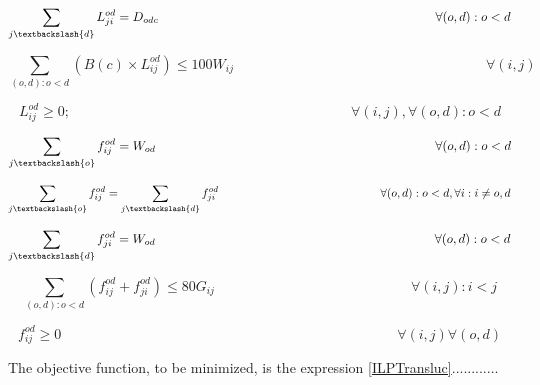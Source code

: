 \begin{equation}
\sum_{j \textbackslash \{d\} } L_{ji}^{od} = D_{odc}
\qquad \qquad \qquad \qquad \qquad \qquad \qquad \qquad \qquad \qquad \qquad
\forall (o,d):o<d
\label{ILPTransluc3}
\end{equation}

\begin{equation}
\sum_{(o,d):o<d} \left( B(c) \times L_{ij}^{od}\right) \leq  100 W_{ij}
\qquad \qquad \qquad \qquad \qquad \qquad \qquad \qquad \qquad
\forall (i,j)
\label{ILPTransluc4}
\end{equation}

\begin{equation}
L_{ij}^{od} \geq 0;
\qquad \qquad \qquad \qquad \qquad \qquad \qquad \qquad \qquad \qquad
\forall (i,j) , \forall (o,d) : o < d
\label{ILPTransluc5}
\end{equation}

\begin{equation}
\sum_{j \textbackslash \{o\} } f_{ij}^{od} = W_{od}
\qquad \qquad \qquad \qquad \qquad \qquad \qquad \qquad \qquad \qquad \qquad
\forall (o,d):o<d
\label{ILPTransluc6}
\end{equation}

\begin{equation}
\sum_{j \textbackslash \{o\} } f_{ij}^{od} = \sum_{j \textbackslash \{d\} } f_{ji}^{od}
\qquad \qquad \qquad \qquad \qquad \qquad \qquad
\forall (o,d):o<d , \forall i : i \neq o,d
\label{ILPTransluc7}
\end{equation}

\begin{equation}
\sum_{j \textbackslash \{d\} } f_{ji}^{od} = W_{od}
\qquad \qquad \qquad \qquad \qquad \qquad \qquad \qquad \qquad \qquad \qquad
\forall (o,d):o<d
\label{ILPTransluc8}
\end{equation}

\begin{equation}
\sum_{(o,d):o<d} \left( f_{ij}^{od} + f_{ji}^{od}\right) \leq 80 G_{ij}
\qquad \qquad \qquad \qquad \qquad \qquad \qquad
\forall (i,j) : i < j
\label{ILPTransluc9}
\end{equation}

\begin{equation}
f_{ij}^{od} \geq 0
\qquad \qquad \qquad \qquad \qquad \qquad \qquad \qquad \qquad \qquad \qquad \qquad
\forall (i,j) \forall (o,d)
\label{ILPTransluc10}
\end{equation}	

\vspace{10pt}

The objective function, to be minimized, is the expression \ref{ILPTransluc}............
